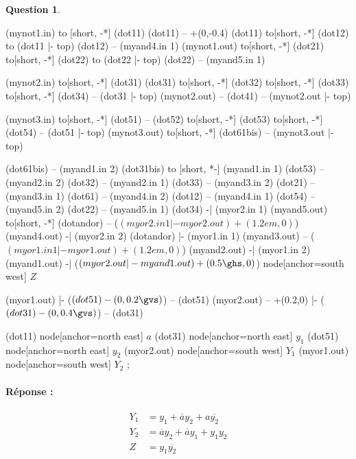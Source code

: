 \documentclass[11pt,a4paper]{article}
\theoremstyle{definition}%
\newtheorem{Q}{Question}[] %
\newcommand{\reponse}[1]{%
	\ifthenelse {\boolean{corrige}} {\paragraph{Réponse :} \color{darkblue}   #1\color{black}} {}
 }
\newlength{\gvs}%
\newlength{\ghs}%
\begin{document}
\begin{Q}
\begin{enumerate}
\begin{center}
\begin{circuitikz}[scale=0.7, every node/.style={scale=0.7}]
				(mynot1.in) to [short, -*] (dot11)
				(dot11) -- +(0,-0.4\gvs)
				(dot11) to[short, -*] (dot12) to (dot11 |- top)
				(dot12) -- (myand4.in 1)
				(mynot1.out) to[short, -*] (dot21) to[short, -*] (dot22) to (dot22 |- top)
				(dot22) -- (myand5.in 1)
		
				(mynot2.in) to[short, -*] (dot31)
				(dot31) to[short, -*] (dot32) to[short, -*] (dot33) to[short, -*] (dot34) -- (dot31 |- top)
				(mynot2.out) -- (dot41) -- (mynot2.out |- top)
		
				(mynot3.in) to[short, -*] (dot51) -- (dot52) to[short, -*] (dot53) to[short, -*] (dot54) -- (dot51 |- top)
				(mynot3.out) to[short, -*] (dot61bis) -- (mynot3.out |- top)
		
				(dot61bis) -- (myand1.in 2)
				(dot31bis) to [short, *-] (myand1.in 1)
				(dot53) -- (myand2.in 2)
				(dot32) -- (myand2.in 1)
				(dot33) -- (myand3.in 2)
				(dot21) -- (myand3.in 1)
				(dot61) -- (myand4.in 2)
				(dot12) -- (myand4.in 1)
				(dot54) -- (myand5.in 2)
				(dot22) -- (myand5.in 1)
				(dot34) -| (myor2.in 1)
				(myand5.out) to[short, -*] (dotandor) -- ($(myor2.in 1 |- myor2.out)+(1.2em,0)$)%
				(myand4.out) -| (myor2.in 2)
				(dotandor) |- (myor1.in 1)
				(myand3.out) -- ($(myor1.in 1 |- myor1.out)+(1.2em,0)$)
				(myand2.out) -| (myor1.in 2)
				(myand1.out) -| ($(myor2.out |- myand1.out)+(0.5\ghs,0)$) node[anchor=south west] {\Large $Z$}
		
				(myor1.out) |- ($(dot51)-(0,0.2\gvs)$) -- (dot51)
				(myor2.out) -- +(0.2\ghs,0) |- ($(dot31)-(0,0.4\gvs)$) -- (dot31)
		
				(dot11) node[anchor=north east] {\Large $a$}
				(dot31) node[anchor=north east] {\Large $y_1$}
				(dot51) node[anchor=north east] {\Large $y_2$}
				(myor2.out) node[anchor=south west] {\Large $Y_1$}
				(myor1.out) node[anchor=south west] {\Large $Y_2$}
				;
			\end{circuitikz}
		\end{center}
		\reponse{
			\begin{align*}
				Y_1 & = y_1 + \overline{a}y_2 + a\overline{y_2}\\
				Y_2 & = \overline{a}y_2 + \overline{a}y_1 + y_1y_2\\
				Z & = y_1\overline{y_2}
			\end{align*}

}
\end{enumerate}
\end{Q}
\end{document}
